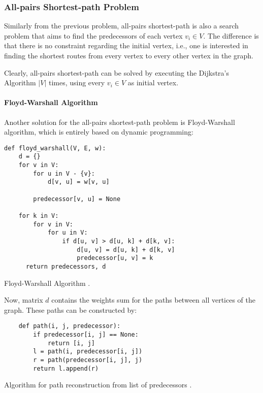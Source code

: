 \subsubsection{All-pairs Shortest-path Problem}

Similarly from the previous problem, all-pairs shortest-path is also a search problem that aims to find the predecessors of each vertex $v_i \in V$. The difference is that there is no constraint regarding the initial vertex, i.e., one is interested in finding the shortest routes from every vertex to every other vertex in the graph.

Clearly, all-pairs shortest-path can be solved by executing the Dijkstra's Algorithm $|V|$ times, using every $v_i \in V$ as initial vertex.

\paragraph{Floyd-Warshall Algorithm}

Another solution for the all-pairs shortest-path problem is Floyd-Warshall algorithm, which is entirely based on dynamic programming:

\begin{listing}[H]
\begin{verbatim}
def floyd_warshall(V, E, w):
    d = {}
    for v in V:
        for u in V - {v}:
            d[v, u] = w[v, u]

        predecessor[v, u] = None

    for k in V:
        for v in V:
            for u in V:
                if d[u, v] > d[u, k] + d[k, v]:
                    d[u, v] = d[u, k] + d[k, v]
                    predecessor[u, v] = k
      return predecessors, d
\end{verbatim}
\caption{Floyd-Warshall Algorithm \cite{golin2003floydwarshall}.}
\end{listing}

Now, matrix $d$ contains  the weights sum for the paths between all vertices of the graph. These paths can be constructed by:

\begin{listing}[H]
\begin{verbatim}
	def path(i, j, predecessor):
		if predecessor[i, j] == None:
			return [i, j]
		l = path(i, predecessor[i, j])
		r = path(predecessor[i, j], j)
		return l.append(r)
\end{verbatim}
\caption{Algorithm for path reconstruction from list of predecessors \cite{golin2003floydwarshall}.}
\end{listing}

